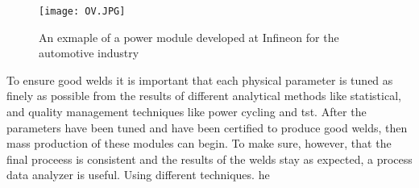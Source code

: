 \documentclass{article}
\begin{document}
\begin{figure}[!t]
    \centering
    \texttt{[image: OV.JPG]}
    \caption{An exmaple of a power module developed at Infineon for the automotive industry}
    \label{fig:enter-label}
\end{figure}
To ensure good welds it is important that each physical parameter is tuned as finely as possible from the results of different analytical methods like statistical, and quality management techniques like power cycling and tst. After the parameters have been tuned and have been certified to produce good welds, then mass production of these modules can begin.
To make sure, however, that the final proceess is consistent and the results of the welds stay as expected, a process data analyzer is useful. Using different techniques. he
\end{document}
